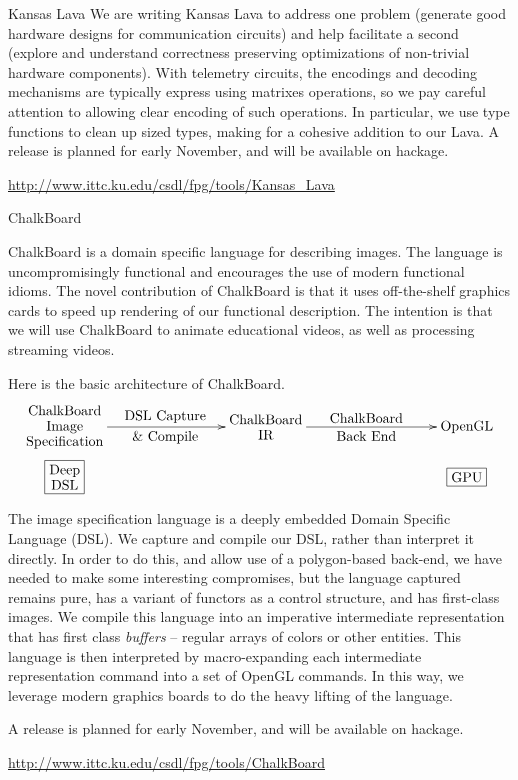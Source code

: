 \documentclass{scrreprt}
\begin{document}
\begin{hcarentry}{Kansas Lava}
We are writing Kansas Lava to address one problem (generate good hardware designs for communication circuits)
and help facilitate a second (explore and understand correctness preserving optimizations of non-trivial
hardware components).
With telemetry circuits, the encodings and decoding mechanisms
are typically express using matrixes operations, so we pay careful
attention to allowing clear encoding of such operations.
In particular, we use type functions to clean up sized types, 
making for a cohesive addition to our Lava.
A release is planned for early November, and will be available on hackage.

\FurtherReading
  \url{http://www.ittc.ku.edu/csdl/fpg/tools/Kansas_Lava}
\end{hcarentry}

\begin{hcarentry}{ChalkBoard}
\makeheader

ChalkBoard is a domain specific language for describing images. 
The language is uncompromisingly functional
and encourages the use of modern functional idioms.
The novel contribution of ChalkBoard is that it uses off-the-shelf
graphics cards to speed up rendering of our functional description.
The intention is that we will use ChalkBoard to animate educational
videos, as well as processing streaming videos.

Here is the basic architecture of ChalkBoard. 
{\small
\[
\xygraph{
!{(-4,0)}{\txt{ChalkBoard\\Image\\Specification}}="CIS",
!{(-4,-1)}*+[F]{\txt{Deep\\DSL}},
!{(0,0)}*+{\txt{ChalkBoard\\IR}}="CBIR",
!{(4,0)}{\txt{OpenGL}}="OpenGL",
!{(4,-1)}*+[F]{\txt{GPU}},
"CIS" :@{->}^{\txt{DSL Capture}}_{\txt{\& Compile}} "CBIR",
"CBIR" :@{->}^{\txt{ChalkBoard}}_{\txt{Back End}} "OpenGL",
!{}
}
\]
}

The image specification language is a deeply embedded Domain Specific Language (DSL).
We capture and compile our DSL, rather than interpret it directly. 
In order to do this, and allow use of a polygon-based back-end,
we have needed to make some interesting compromises,
but the language captured remains pure, has a variant
of functors as a control structure,
and has first-class images.
We compile this language into an imperative intermediate representation
that has first class {\em buffers} -- regular arrays of colors or other entities.
This language is then interpreted by macro-expanding each intermediate representation
command into a set of OpenGL commands.  In this
way, we leverage modern  graphics boards to
do the heavy lifting of the language. 

A release is planned for early November, and will be available on hackage.

\FurtherReading
  \url{http://www.ittc.ku.edu/csdl/fpg/tools/ChalkBoard}
\end{hcarentry}
\end{document}

